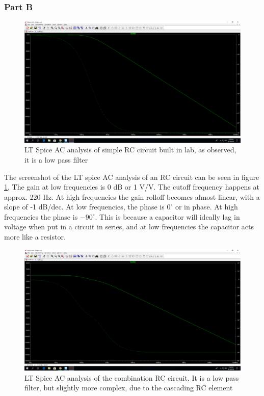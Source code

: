 \documentclass[10pt]{article}
\begin{document}
\subsubsection{Part B}
\begin{center}
	\begin{figure} [H]
		\centering
		\includegraphics[scale=0.22]{images/simple.png}
		\caption{LT Spice AC analysis of simple RC circuit built in lab, as observed, it is a low pass filter}
		\label{fig:simpleRC}
	\end{figure}
\end{center}
The screenshot of the LT spice AC analysis of an RC circuit can be seen in figure \ref{fig:simpleRC}, The gain at low frequencies is 0 dB or 1 V/V. The cutoff frequency happens at approx. 220 Hz. At high frequencies the gain rolloff becomes almost linear, with a slope of -1 dB/dec. At low frequencies, the phase is $0^\circ$ or in phase. At high frequencies the phase is $-90^\circ$. This is because a capacitor will ideally lag in voltage when put in a circuit in series, and at low frequencies the capacitor acts more like a resistor.
\begin{center}
	\begin{figure} [H]
		\centering
		\includegraphics[scale=0.22]{images/cascade.png}
		\caption{LT Spice AC analysis of the combination RC circuit. It is a low pass filter, but slightly more complex, due to the cascading RC element}
		\label{fig:cascading}
	\end{figure}
\end{center}
\end{document}
